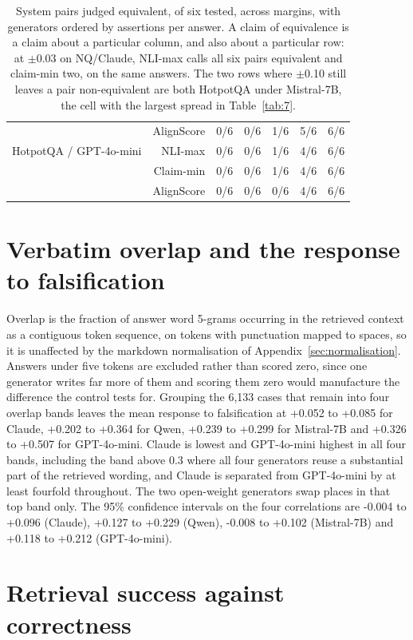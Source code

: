 \documentclass[11pt]{article}
\newcommand{\movedref}{Appendix}            %
\newcommand{\movedref}{Section}
\begin{document}
\begin{table}[t]
\begin{tabular}{lrrrrrr}
 & AlignScore & 0/6 & 0/6 & 1/6 & 5/6 & 6/6 \\
HotpotQA / GPT-4o-mini & NLI-max & 0/6 & 0/6 & 1/6 & 4/6 & 6/6 \\
 & Claim-min & 0/6 & 0/6 & 1/6 & 4/6 & 6/6 \\
 & AlignScore & 0/6 & 0/6 & 0/6 & 4/6 & 6/6 \\
\bottomrule
\end{tabular}
\caption{System pairs judged equivalent, of six tested, across margins, with generators ordered by assertions per answer. A claim of equivalence is a claim about a particular column, and also about a particular row: at $\pm$0.03 on NQ/Claude, NLI-max calls all six pairs equivalent and claim-min two, on the same answers. The two rows where $\pm$0.10 still leaves a pair non-equivalent are both HotpotQA under Mistral-7B, the cell with the largest spread in Table~\ref{tab:7}.}
\label{tab:9}
\end{table}

\section{Verbatim overlap and the response to falsification}
\label{app:copying}

Overlap is the fraction of answer word 5-grams occurring in the retrieved context as a contiguous token sequence, on tokens with punctuation mapped to spaces, so it is unaffected by the markdown normalisation of \movedref~\ref{sec:normalisation}. Answers under five tokens are excluded rather than scored zero, since one generator writes far more of them and scoring them zero would manufacture the difference the control tests for. Grouping the 6,133 cases that remain into four overlap bands leaves the mean response to falsification at +0.052 to +0.085 for Claude, +0.202 to +0.364 for Qwen, +0.239 to +0.299 for Mistral-7B and +0.326 to +0.507 for GPT-4o-mini. Claude is lowest and GPT-4o-mini highest in all four bands, including the band above 0.3 where all four generators reuse a substantial part of the retrieved wording, and Claude is separated from GPT-4o-mini by at least fourfold throughout. The two open-weight generators swap places in that top band only. The 95\% confidence intervals on the four correlations are -0.004 to +0.096 (Claude), +0.127 to +0.229 (Qwen), -0.008 to +0.102 (Mistral-7B) and +0.118 to +0.212 (GPT-4o-mini).

\section{Retrieval success against correctness}
\label{app:cell}
\end{document}
